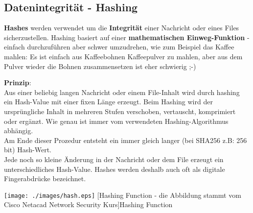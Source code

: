 \documentclass[10pt,a4paper,titlepage]{article}
\begin{document}
\subsection{Datenintegrität - Hashing} \label{hash}
\textbf{Hashes} werden verwendet um die \textbf{Integrität} einer Nachricht oder eines Files sicherzustellen. Hashing basiert auf einer \textbf{mathematischen Einweg-Funktion} - einfach durchzuführen aber schwer umzudrehen, wie zum Beispiel das Kaffee mahlen: Es ist einfach aus Kaffeebohnen Kaffeepulver zu mahlen, aber aus dem Pulver wieder die Bohnen zusammensetzen ist eher schwierig ;-)\\
\begin{minipage}{6.7cm}
\textbf{Prinzip}:\\Aus einer beliebig langen Nachricht oder einem File-Inhalt wird durch hashing ein Hash-Value mit einer fixen Länge erzeugt.
Beim Hashing wird der ursprüngliche Inhalt in mehreren Stufen verschoben, vertauscht, komprimiert oder ergänzt. Wie genau ist immer vom verwendeten Hashing-Algorithmus abhängig.\\
Am Ende dieser Prozedur entsteht ein immer gleich langer (bei SHA256 z.B: 256 bit) Hash-Wert.\\ Jede noch so kleine Änderung in der Nachricht oder dem File erzeugt ein unterschiedliches Hash-Value. Hashes werden deshalb auch oft als digitale Fingerabdrücke bezeichnet. 
\end{minipage}
\begin{minipage}{8cm}
\begin{center}

\texttt{[image: ./images/hash.eps]}
[Hashing Function - die Abbildung stammt vom Cisco Netacad Network Security Kurs]{Hashing Function}

\end{center}
\end{minipage}
\end{document}
